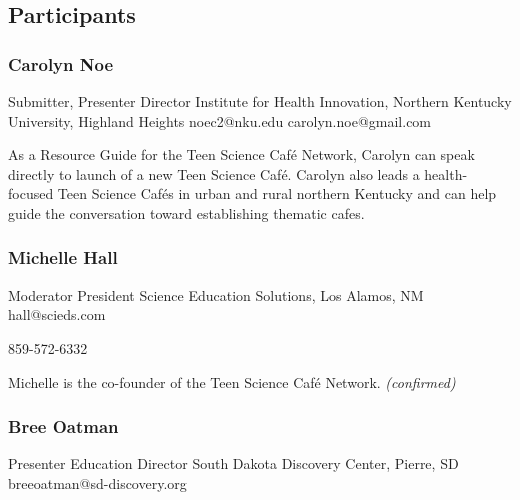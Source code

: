 \documentclass{report}
\begin{document}
            \subsection*{Participants}
              \subsubsection*{ Carolyn Noe }
              Submitter, Presenter\newline
              Director\newline
              Institute for Health Innovation, Northern Kentucky University, Highland Heights
              \newline
              noec2@nku.edu\newline
              carolyn.noe@gmail.com\newline

              As a Resource Guide for the Teen Science Café Network, Carolyn can speak directly to launch of a new Teen Science Café. Carolyn also leads a health-focused Teen Science Cafés in urban and rural northern Kentucky and can help guide the conversation toward establishing thematic cafes.\newline


              
                \subsubsection*{ Michelle Hall }
                Moderator\newline
                President\newline
                Science Education Solutions, Los Alamos, NM
                \newline
                hall@scieds.com\newline
                
                859-572-6332\newline

                Michelle is the co-founder of the Teen Science Café Network.\newline
                \emph{ (confirmed) }
              

              
                \subsubsection*{ Bree Oatman }
                Presenter\newline
                Education Director\newline
                South Dakota Discovery Center, Pierre, SD
                \newline
                breeoatman@sd-discovery.org\newline
                
\end{document}
